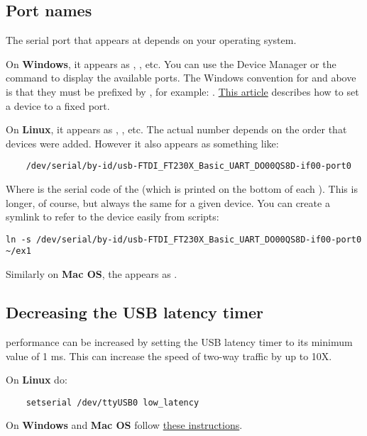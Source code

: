 \subsection{Port names}\label{portnames}

The serial port that \device{} appears at depends on your operating system.

On \textbf{Windows}, it appears as , ,  etc.
You can use the Device Manager or the  command to display the available ports.
The Windows convention for  and above  is that they must be prefixed by
,
for example:
.
\href{https://plugable.com/2011/07/04/how-to-change-the-com-port-for-a-usb-serial-adapter-on-windows-7/}{This article}
describes how to set a device to a fixed port.

On \textbf{Linux}, it appears as , ,  etc.
The actual number depends on the order that devices were added.
However it also appears as something like:
\begin{lstlisting}
    /dev/serial/by-id/usb-FTDI_FT230X_Basic_UART_DO00QS8D-if00-port0
\end{lstlisting}
Where  is the serial code of the \device{} (which is printed on the bottom of each \device{}).
This is longer, of course, but always the same for a given device.
You can create a symlink to refer to the device easily from scripts:

\begin{lstlisting}
ln -s /dev/serial/by-id/usb-FTDI_FT230X_Basic_UART_DO00QS8D-if00-port0 ~/ex1
\end{lstlisting}

Similarly on \textbf{Mac OS}, the \device{} appears as .

\subsection{Decreasing the USB latency timer}

\device{} performance can be increased by setting the USB latency timer to its minimum value of 1 ms.
This can increase the speed of two-way traffic by up to 10X.

On \textbf{Linux} do:

\begin{lstlisting}
    setserial /dev/ttyUSB0 low_latency
\end{lstlisting}

On \textbf{Windows} and \textbf{Mac OS} follow
\href{https://projectgus.com/2011/10/notes-on-ftdi-latency-with-arduino/}{these instructions}.

